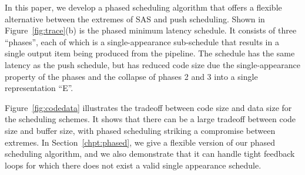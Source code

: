 \documentclass{sig-alt-full}
\begin{document}
In this paper, we develop a phased scheduling algorithm that offers a
flexible alternative between the extremes of SAS and push scheduling.
Shown in Figure~\ref{fig:trace}(b) is the phased minimum latency
schedule.  It consists of three ``phases'', each of which is a
single-appearance sub-schedule that results in a single output item
being produced from the pipeline.  The schedule has the same latency
as the push schedule, but has reduced code size due the
single-appearance property of the phases and the collapse of phases 2
and 3 into a single representation ``E''.

Figure~\ref{fig:codedata} illustrates the tradeoff between code size
and data size for the scheduling schemes.  It shows that there can be
a large tradeoff between code size and buffer size, with phased
scheduling striking a compromise between extremes.  In
Section~\ref{chpt:phased}, we give a flexible version of our phased
scheduling algorithm, and we also demonstrate that it can handle tight
feedback loops for which there does not exist a valid single
appearance schedule.

\begin{comment}
We can compare the storage efficiency of these two schedules by
assuming that one data item in a buffer requires $x$ amount of memory
and each entry in a schedule requires $y$ amount of memory.  Thus the
two schedules will require the same amount of storage to store
themselves and execute if $11 x + 18 y = 39 x + 4 y$.

\begin{displaymath}
\begin{array}{rcl}
11 x + 18 y & = & 39 x + 4 y \\
14 y & = & 28 x \\
y & = & 2x
\end{array}
\end{displaymath}

Thus the smaller schedule is more efficient if every data item
requires less than twice the amount of storage than every entry in
the schedule.

One of the difficulties in scheduling {\StreamIt} programs lies in
finding a good set of trade-offs between schedule size and
buffering requirements.
\end{comment}
\end{document}
